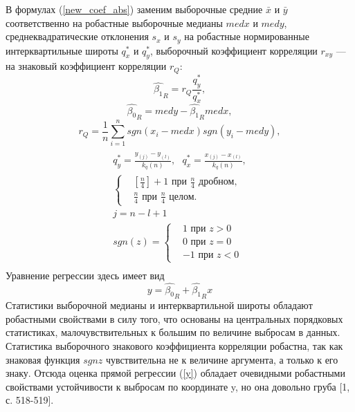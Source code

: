 \documentclass[a4paper]{article}
\begin{document}
            В формулах (\ref{new_coef_abs}) заменим выборочные средние $\bar{x}$ и $\bar{y}$ соответственно на робастные выборочные медианы $med x$ и $med y$, среднеквадратические отклонения $s_{x}$ и $s_{y}$ на робастные нормированные интерквартильные широты $q^{*}_{x}$ и $q^{*}_{y}$, выборочный коэффициент корреляции $r_{xy}$ — на знаковый коэффициент корреляции $r_{Q}$:
            \begin{equation}
                \hat{\beta_{1}}_{R} = r_{Q}\frac{q^{*}_{y}}{q^{*}_{x}},
                \label{b_1R}
            \end{equation}
            \begin{equation}
                \hat{\beta_{0}}_{R} = med y - \hat{\beta_{1}}_{R} med x,
                \label{b_0R}
            \end{equation}
            \begin{equation}
                r_{Q} = \frac{1}{n}\sum_{i=1}^{n}{sgn(x_{i} - med x)sgn(y_{i} - med y)},
                \label{r_Q}
            \end{equation}
            \begin{multline}
            \\
                q^{*}_{y} = \frac{y_{(j)} -y_{(l)}}{k_{q}(n)},~~~
                q^{*}_{x} = \frac{x_{(j)} - x_{(l)}}{k_{q}(n)}, \\
                \begin{cases}
                     & [\frac{n}{4}] + 1 \text{ при } \frac{n}{4} \text{ дробном, } \\
                     & \frac{n}{4} \text{ при } \frac{n}{4} \text{ целом. }
                \end{cases}\\
                j = n - l + 1\\
                sgn(z) = \begin{cases}
                            & 1 \text{ при } z > 0 \\
                            & 0 \text{ при } z = 0 \\
                            & -1 \text{ при } z < 0
                         \end{cases}\\
                \label{q*}
            \end{multline}
            Уравнение регрессии здесь имеет вид
            \begin{equation}
                y = \hat{\beta_{0}}_{R} +  \hat{\beta_{1}}_{R}x
                \label{y}
            \end{equation}
            Статистики выборочной медианы и интерквартильной широты обладают робастными свойствами в силу того, что основаны на центральных порядковых статистиках, малочувствительных к большим по величине выбросам в данных. Статистика выборочного знакового коэффициента корреляции робастна, так как знаковая функция $sgn z$ чувствительна не к величине аргумента, а только к его знаку. Отсюда оценка прямой регрессии (\ref{y}) обладает очевидными робастными свойствами устойчивости к выбросам по координате y, но она довольно груба [1, с. 518-519].
\end{document}
